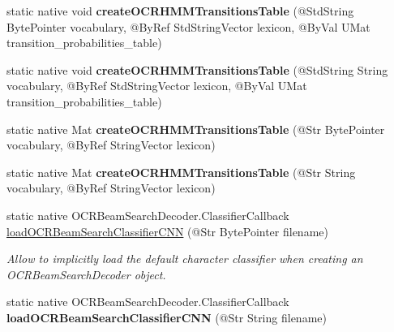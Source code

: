 \begin{DoxyCompactItemize}
\item 
\mbox{\label{classorg_1_1bytedeco_1_1javacpp_1_1opencv__text_abb5e6bd26a8a25684e3aef2c36433315}} 
static native void {\bfseries create\+O\+C\+R\+H\+M\+M\+Transitions\+Table} (@Std\+String Byte\+Pointer vocabulary, @By\+Ref Std\+String\+Vector lexicon, @By\+Val U\+Mat transition\+\_\+probabilities\+\_\+table)
\item 
\mbox{\label{classorg_1_1bytedeco_1_1javacpp_1_1opencv__text_a1e99292b213c8d913b08cea827c68eb1}} 
static native void {\bfseries create\+O\+C\+R\+H\+M\+M\+Transitions\+Table} (@Std\+String String vocabulary, @By\+Ref Std\+String\+Vector lexicon, @By\+Val U\+Mat transition\+\_\+probabilities\+\_\+table)
\item 
\mbox{\label{classorg_1_1bytedeco_1_1javacpp_1_1opencv__text_a7a29e2f9486226f47cbcec670e8bf838}} 
static native Mat {\bfseries create\+O\+C\+R\+H\+M\+M\+Transitions\+Table} (@Str Byte\+Pointer vocabulary, @By\+Ref String\+Vector lexicon)
\item 
\mbox{\label{classorg_1_1bytedeco_1_1javacpp_1_1opencv__text_a2432d5dfc513418ff6382020af067067}} 
static native Mat {\bfseries create\+O\+C\+R\+H\+M\+M\+Transitions\+Table} (@Str String vocabulary, @By\+Ref String\+Vector lexicon)
\item 
static native O\+C\+R\+Beam\+Search\+Decoder.\+Classifier\+Callback \hyperlink{classorg_1_1bytedeco_1_1javacpp_1_1opencv__text_ac5185baf5c06198df5eb4c500afcbcf0}{load\+O\+C\+R\+Beam\+Search\+Classifier\+C\+NN} (@Str Byte\+Pointer filename)
\begin{DoxyCompactList}\small\item\em Allow to implicitly load the default character classifier when creating an O\+C\+R\+Beam\+Search\+Decoder object. \end{DoxyCompactList}\item 
\mbox{\label{classorg_1_1bytedeco_1_1javacpp_1_1opencv__text_ad5487feed505ad5441870766dc866000}} 
static native O\+C\+R\+Beam\+Search\+Decoder.\+Classifier\+Callback {\bfseries load\+O\+C\+R\+Beam\+Search\+Classifier\+C\+NN} (@Str String filename)
\end{DoxyCompactItemize}
